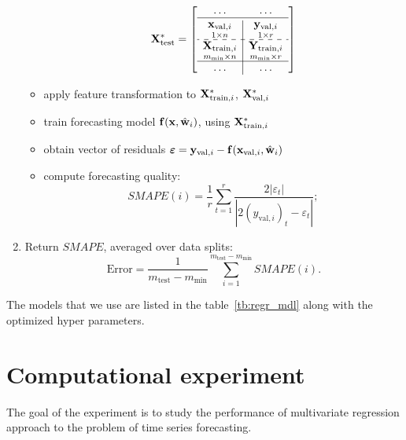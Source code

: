 \documentclass[conference]{IEEEtran}
\begin{document}
\begin{enumerate}[1)]
\begin{itemize}
 \[\bX^{*}_{\text{test}} = \left[\begin{array}{c|c}
 \dots & \dots \\
 \hline
 \underset{1{\times}n}{\bx_{\text{val}, i}} & \underset{1{\times}r}{\by_{\text{val}, i}}  \\
 \hdashline
 \underset{m_{\min}{\times}n}{\bX_{\text{train}, i}}  & \underset{m_{\min}{\times}r}{\bY_{\text{train}, i}} \\
 \hline
 \dots & \dots \\
 \end{array}\right]
 \]
\item apply feature transformation to ${\mathbf{X}}^{*}_{\text{train}, i}$, ${\mathbf{X}}^{*}_{\text{val}, i}$\;
\item  train forecasting model ${\mathbf{f}}({\mathbf{x}}, \hat{{\mathbf{w}}}_i)$, using ${\mathbf{X}}^{*}_{\text{train}, i}$\;
\item  obtain vector of residuals ${\boldsymbol{\varepsilon}}  = {\mathbf{y}}_{\text{val}, i} - {\mathbf{f}}({\mathbf{x}}_{\text{val}, i}, \hat{{\mathbf{w}}}_i)$\;
\item  compute forecasting quality:
  \[ {SMAPE}(i)  = \frac{1}{r} \sum_{t=1}^{r} \frac{2|\varepsilon_{t}|}{|2(y_{\text{val}, i})_t - \varepsilon_{t}|};\]
\end{itemize}
\item
  Return $SMAPE$, averaged over data splits:
  \[ \text{Error}  = \frac{1}{m_{\text{test}} - m_{\min}} \sum_{i=1}^{m_{\text{test}} - m_{\min}} {SMAPE}(i).\]
\end{enumerate}
The models that we use are listed in the table~\ref{tb:regr_mdl} along with the optimized hyper parameters.


\section{Computational experiment}
The goal of the experiment is to study the performance of multivariate regression approach to the problem of
time series forecasting.
\end{document}
